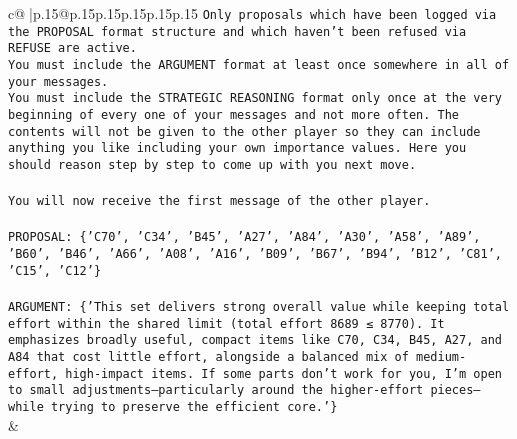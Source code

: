 \documentclass{article}
\begin{document}
{\begin{supertabular}{c@{$\;$}|p{.15\linewidth}@{}p{.15\linewidth}p{.15\linewidth}p{.15\linewidth}p{.15\linewidth}p{.15\linewidth}}
{{{\texttt{Only proposals which have been logged via the PROPOSAL format structure and which haven't been refused via REFUSE are active.} \\
\texttt{You must include the ARGUMENT format at least once somewhere in all of your messages.} \\
\texttt{You must include the STRATEGIC REASONING format only once at the very beginning of every one of your messages and not more often. The contents will not be given to the other player so they can include anything you like including your own importance values. Here you should reason step by step to come up with you next move.} \\
\\ 
\texttt{You will now receive the first message of the other player.} \\
\\ 
\texttt{PROPOSAL: \{'C70', 'C34', 'B45', 'A27', 'A84', 'A30', 'A58', 'A89', 'B60', 'B46', 'A66', 'A08', 'A16', 'B09', 'B67', 'B94', 'B12', 'C81', 'C15', 'C12'\}} \\
\\ 
\texttt{ARGUMENT: \{'This set delivers strong overall value while keeping total effort within the shared limit (total effort 8689 ≤ 8770). It emphasizes broadly useful, compact items like C70, C34, B45, A27, and A84 that cost little effort, alongside a balanced mix of medium{-}effort, high{-}impact items. If some parts don’t work for you, I’m open to small adjustments—particularly around the higher{-}effort pieces—while trying to preserve the efficient core.'\}} \\
            }
        }
    }
    & \\ \\


\end{supertabular}}
\end{document}
